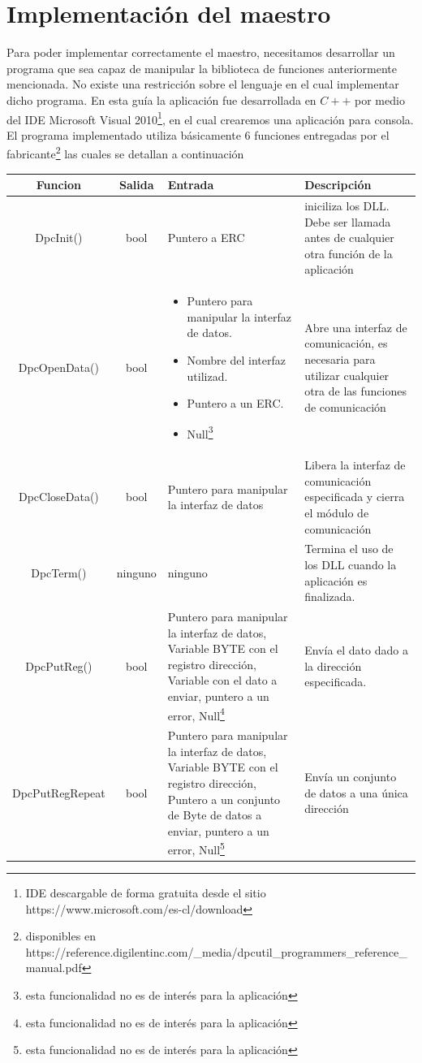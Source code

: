 \documentclass[11pt,letterpaper,spanish]{article}
\begin{document}
\section{Implementación del maestro\label{sec6}}
Para poder implementar correctamente el maestro, necesitamos desarrollar un programa que sea capaz de manipular la biblioteca  de funciones anteriormente mencionada. No existe una restricción sobre el lenguaje en el cual implementar dicho programa. En esta guía la aplicación fue desarrollada en $C++$ por medio del IDE Microsoft Visual 2010\footnote{IDE descargable de forma gratuita desde el sitio https://www.microsoft.com/es-cl/download}, en el cual crearemos una aplicación para consola.
El programa implementado utiliza básicamente 6 funciones entregadas por el fabricante\footnote{disponibles en https://reference.digilentinc.com/\_media/dpcutil\_programmers\_reference\_manual.pdf} las cuales se detallan a continuación

\begin{table}
\begin{center}
\begin{tabular}{|c|c|p{5cm}|p{5cm}|}
\hline 
Funcion & Salida & Entrada & Descripción \\ 
\hline 
DpcInit() & bool & Puntero a ERC & iniciliza los DLL. Debe ser llamada antes de cualquier otra función de la aplicación \\ 
\hline 
DpcOpenData() & bool & \begin{itemize}
\item Puntero para manipular la interfaz de datos.
\item Nombre del interfaz utilizad.
\item Puntero a un ERC. 
\item Null\footnote{esta funcionalidad no es de interés para la aplicación}
\end{itemize}  & Abre una interfaz de comunicación, es necesaria para utilizar cualquier otra de las funciones de comunicación  \\ 
\hline 
DpcCloseData() & bool & Puntero para manipular la interfaz de datos & Libera la interfaz de comunicación especificada y cierra el módulo de comunicación \\ 
\hline 
DpcTerm() & ninguno & ninguno & Termina el uso de los DLL cuando la aplicación es finalizada. \\ 
\hline 
DpcPutReg() & bool & Puntero para manipular la interfaz de datos, Variable BYTE con el registro dirección, Variable con el dato a enviar, puntero a un error, Null\footnote{esta funcionalidad no es de interés para la aplicación} & Envía el dato dado a la dirección especificada. \\ 
\hline 
DpcPutRegRepeat & bool & Puntero para manipular la interfaz de datos, Variable BYTE con el registro dirección, Puntero a un conjunto de Byte de datos a  enviar, puntero a un error, Null\footnote{esta funcionalidad no es de interés para la aplicación}  & Envía un conjunto de datos a una única dirección \\ 
\hline 
\end{tabular} 
\end{center}
\end{table}
\end{document}
